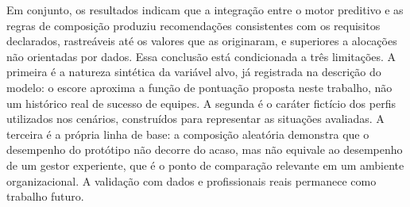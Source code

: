 Em conjunto, os resultados indicam que a integração entre o motor preditivo e as regras de composição produziu recomendações consistentes com os requisitos declarados, rastreáveis até os valores que as originaram, e superiores a alocações não orientadas por dados. Essa conclusão está condicionada a três limitações. A primeira é a natureza sintética da variável alvo, já registrada na descrição do modelo: o escore aproxima a função de pontuação proposta neste trabalho, não um histórico real de sucesso de equipes. A segunda é o caráter fictício dos perfis utilizados nos cenários, construídos para representar as situações avaliadas. A terceira é a própria linha de base: a composição aleatória demonstra que o desempenho do protótipo não decorre do acaso, mas não equivale ao desempenho de um gestor experiente, que é o ponto de comparação relevante em um ambiente organizacional. A validação com dados e profissionais reais permanece como trabalho futuro.
